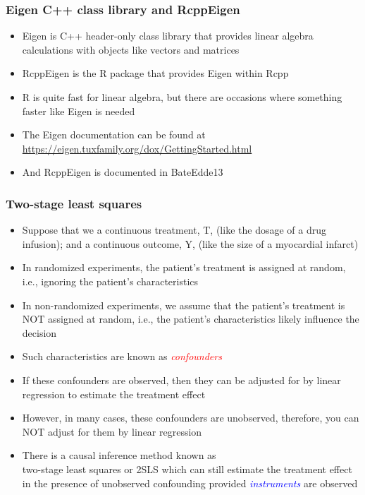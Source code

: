 \documentclass[11pt,pdftex,dvipsnames,usenames,helvetica]{beamer}
\begin{document}
\begin{frame}[fragile]
\frametitle{Eigen C++ class library and RcppEigen}

\begin{itemize}
\item Eigen is C++ header-only class library that provides
linear algebra calculations with objects like vectors and matrices
\item RcppEigen is the R package that provides Eigen within Rcpp
\item R is quite fast for linear algebra, but there are occasions
where something faster like Eigen is needed
\item The Eigen documentation can be found at\\
\url{https://eigen.tuxfamily.org/dox/GettingStarted.html}
\item And RcppEigen is documented in BateEdde13
\end{itemize}

\end{frame}

\begin{frame}[fragile]
\frametitle{Two-stage least squares}

\begin{itemize}
\item Suppose that we a continuous treatment, T, (like the dosage
of a drug infusion); and a continuous outcome, Y, (like the size of a
myocardial infarct) 
\item In randomized experiments, the patient's treatment is assigned 
at random, i.e., ignoring the patient's characteristics
\item In non-randomized experiments, we assume that the patient's
  treatment is NOT assigned at random, i.e., the patient's
  characteristics likely influence the decision
\item Such characteristics are known as \textcolor{red}{\it confounders}
\item If these confounders are observed, then they can be adjusted for
  by linear regression to estimate the treatment effect
\item However, in many cases, these confounders are unobserved,
therefore, you can NOT adjust for them by linear regression
\item There is a causal inference method known as\\
two-stage least squares or 2SLS which can still estimate the
treatment effect in the presence of unobserved confounding
provided \textcolor{blue}{\it instruments} are observed
\end{itemize}
\end{frame}
\end{document}
